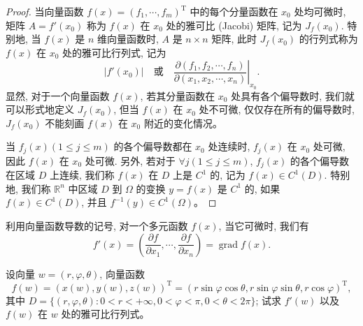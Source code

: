 \documentclass[UTF8,12pt,a4paper,fontset=fandol]{ctexart}
\begin{document}
\begin{proof}
当向量函数 $f(x)=(f_1,\cdots,f_m)^\mathrm T$ 中的每个分量函数在 $x_0$ 处均可微时, 矩阵 $A=f'(x_0)$ 称为 $f(x)$ 在 $x_0$ 处的雅可比 (Jacobi) 矩阵, 记为 $J_f(x_0)$. 特别地, 当 $f(x)$ 是 $n$ 维向量函数时, $A$ 是 $n\times n$ 矩阵, 此时 $J_f(x_0)$ 的行列式称为 $f(x)$ 在 $x_0$ 处的雅可比行列式, 记为
\[
  |f'(x_0)|\quad\text{或}\quad
  \left.\frac{\partial(f_1,f_2,\cdots,f_n)}{\partial(x_1,x_2,\cdots,x_n)}\right|_{x_0}.
\]
显然, 对于一个向量函数 $f(x)$, 若其分量函数在 $x_0$ 处具有各个偏导数时, 我们就可以形式地定义 $J_f(x_0)$, 但当 $f(x)$ 在 $x_0$ 处不可微, 仅仅存在所有的偏导数时, $J_f(x_0)$ 不能刻画 $f(x)$ 在 $x_0$ 附近的变化情况。

当 $f_j(x)(1\leqslant j\leqslant m)$ 的各个偏导数都在 $x_0$ 处连续时, $f_j(x)$ 在 $x_0$ 处可微, 因此 $f(x)$ 在 $x_0$ 处可微. 另外, 若对于 $\forall j(1\leqslant j\leqslant m)$, $f_j(x)$ 的各个偏导数在区域 $D$ 上连续, 我们称 $f(x)$ 在 $D$ 上是 $C^1$ 的, 记为 $f(x)\in C^1(D)$. 特别地, 我们称 $\mathbb R^n$ 中区域 $D$ 到 $\Omega$ 的变换 $y=f(x)$ 是 $C^1$ 的, 如果 $f(x)\in C^1(D)$, 并且 $f^{-1}(y)\in C^1(\Omega)$。

\end{proof}
\begin{remark}\quad 利用向量函数导数的记号, 对一个多元函数 $f(x)$, 当它可微时, 我们有
\[
  f'(x)=\left(\frac{\partial f}{\partial x_1},\cdots,\frac{\partial f}{\partial x_n}\right)=\operatorname{grad}f(x).
\]

\end{remark}
\begin{example}\label{course-example-14-1-8}\quad 设向量 $w=(r,\varphi,\theta)$, 向量函数
\[
  f(w)=(x(w),y(w),z(w))^\mathrm T
  =(r\sin\varphi\cos\theta,r\sin\varphi\sin\theta,r\cos\varphi)^\mathrm T,
\]
其中 $D=\{(r,\varphi,\theta):0<r<+\infty,0<\varphi<\pi,0<\theta<2\pi\}$; 试求 $f'(w)$ 以及 $f(w)$ 在 $w$ 处的雅可比行列式。

\end{example}
\end{document}
